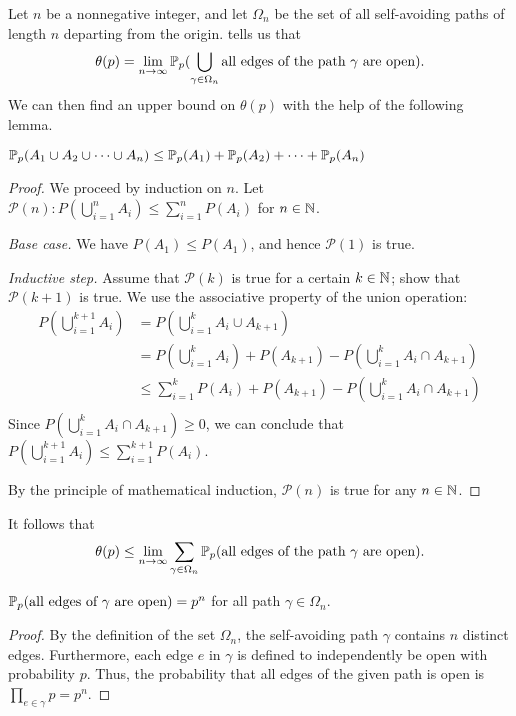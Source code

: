 \documentclass[a4paper, 12pt]{article}
\begin{document}
Let $n$ be a nonnegative integer, and let $\Omega_n$ be the set of all self-avoiding paths of length $n$ departing from the origin.  tells us that
\[\theta(p) = \lim_{n \to \infty} \P(\bigcup_{\gamma \in \Omega_n} \text{all edges of the path } \gamma \text{ are open}).\]
We can then find an upper bound on $\theta(p)$ with the help of the following lemma.

\begin{lem}\label{lem:union_bound}
$\P(A_1 \cup A_2 \cup \cdots \cup A_n) \leq \P(A_1) + \P(A_2) + \cdots + \P(A_n)$
\end{lem}
\begin{proof}[Proof]
We proceed by induction on $n$. Let $\mathcal{P}(n): P(\bigcup_{i = 1}^n A_i) \leq \sum_{i = 1}^n P(A_i)$ for  $n \in \N$.
\begin{description}
\item \textit{Base case.} We have $P(A_1) \leq P(A_1)$, and hence $\mathcal{P}(1)$ is true.
\item \textit{Inductive step.} Assume that $\mathcal{P}(k)$ is true for a certain $k \in \N$; show that $\mathcal{P}(k + 1)$ is true.
We use the associative property of the union operation:
\begin{align*}
    P(\bigcup_{i = 1}^{k + 1} A_i) 
    &= P(\bigcup_{i = 1}^{k} A_i \cup A_{k + 1})\\
    &= P(\bigcup_{i = 1}^{k} A_i) + P(A_{k + 1}) - P(\bigcup_{i = 1}^{k} A_i \cap A_{k + 1})\\
    &\leq \sum_{i = 1}^k P(A_i) + P(A_{k + 1}) - P(\bigcup_{i = 1}^{k} A_i \cap A_{k + 1})\\
\end{align*}
Since $P(\bigcup_{i = 1}^{k} A_i \cap A_{k + 1}) \geq 0$, we can conclude that $P(\bigcup_{i = 1}^{k + 1} A_i) \leq \sum_{i = 1}^{k + 1} P(A_i)$.
\end{description}
By the principle of mathematical induction, $\mathcal{P}(n)$ is true for any $n \in \N$.
\end{proof}

It follows that
\[\theta(p) \leq \lim_{n \to \infty} \sum_{\gamma \in \Omega_n} \P(\text{all edges of the path } \gamma \text{ are open}).\]

\begin{prop}
$\P(\text{all edges of } \gamma \text{ are open}) = p^n$ for all path $\gamma \in \Omega_n$.
\end{prop}
\begin{proof}
By the definition of the set $\Omega_n$, the self-avoiding path $\gamma$ contains $n$ distinct edges. Furthermore, each edge $e$ in $\gamma$ is defined to independently be open with probability $p$. Thus, the probability that all edges of the given path is open is $\prod_{e \in \gamma} p = p^n$.
\end{proof}
\end{document}
